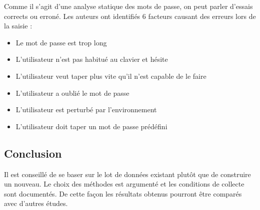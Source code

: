 Comme il s'agit d'une analyse statique des mots de passe, on peut parler d'essais corrects ou erroné. Les auteurs ont identifiés 6 facteurs causant des erreurs lors de la saisie :\\

\begin{itemize}
  \item Le mot de passe est trop long
  \item L'utilisateur n'est pas habitué au clavier et hésite
  \item L'utilisateur veut taper plus vite qu'il n'est capable de le faire
  \item L'utilisateur a oublié le mot de passe
  \item L'utilisateur est perturbé par l'environnement
  \item L'utilisateur doit taper un mot de passe prédéfini
\end{itemize}

\subsection{Conclusion}

Il est conseillé de se baser sur le lot de données existant plutôt que de construire un nouveau. Le choix des méthodes est argumenté et les conditions de collecte sont documentés. De cette façon les résultats obtenus pourront être comparés avec d'autres études.
